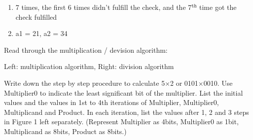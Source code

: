 \documentclass[12pt, a4paper]{article}
\begin{document}
\begin{ans}
    \begin{enumerate}
        \item 7 times, the first 6 times didn't fulfill the check, and the 7$^{\texttt{th}}$ time got the check fulfilled
        \item a1 = 21, a2 = 34 
    \end{enumerate}
\end{ans}
\pagebreak
\begin{q}{20}
Read through the multiplication / devision algorithm: 
\begin{center}
    Left: multiplication algorithm, Right: division algorithm
\end{center}
Write down the step by step procedure to calculate 5×2 or 0101×0010. Use Multiplier0
to indicate the least significant bit of the multiplier. List the initial values and the values
in 1st to 4th iterations of Multiplier, Multiplier0, Multiplicand and Product. In each
iteration, list the values after 1, 2 and 3 steps in Figure 1 left separately. (Represent
Multiplier as 4bits, Multiplier0 as 1bit, Multiplicand as 8bits, Product as 8bits.)
\end{q}
\end{document}
